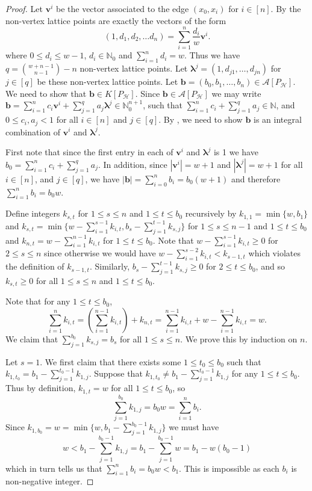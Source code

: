 \documentclass [12pt,a4paper,reqno]{amsart}
\theoremstyle{plain}
\theoremstyle{definition}
\newtheorem{Assumptions and Discussion}[Theorem]{Assumptions and Discussion}
\theoremstyle{remark}
\def\NN{{\mathbb N}}
\def\N{\operatorname{N}} %
\def\N{{\mathbb N}}
\newcommand\bfb{\mathbf{b}}
\newcommand\bfv{\mathbf{v}}
\newcommand\bflam{\boldsymbol{\lambda}}
\newcommand\calA{\mathcal{A}}
\newcommand\calH{\mathcal{H}}
\begin{document}
 \begin{proof}
Let $\mathbf{v}^i$ be the vector associated to the edge $(x_0, x_i)$ for $i\in [n]$. By  the non-vertex lattice points are exactly the vectors of the form 
 \[
    (1,d_1,d_2,\dots d_n)=\sum_{i=1}^n\frac{d_i}{w}\bfv^i. 
 \]
 where $0\leq d_i \leq w-1$, $ d_i \in \mathbb{N}_{0}$ and $\sum_{i=1}^n d_i=w$. 
 Thus we have  $q={w+n-1 \choose n-1} -n$ non-vertex lattice points. Let $\bflam^j=(1,d_{j1},\ldots,d_{jn})$ for $j\in [q]$ be these non-vertex lattice points. Let $\mathbf{b}=(b_{0},b_{1},\ldots,b_{n})\in \calA[P_{\calH}]$.  We need to show that $\bfb\in K[P_{\calH}]$.
Since $\mathbf{b} \in \calA[P_{\calH}]$ we may write $\mathbf{b}=\sum_{i=1}^{n}c_{i}\mathbf{v}^{i}+\sum_{j=1}^{q}a_j\bflam^{j} \in \NN_{0}^{n+1}$, such that
$\sum_{i=1}^{n}c_{i}+\sum_{j=1}^{q}a_{j} \in \N$, and $0\leq c_{i},a_{j}<1$
for all $i\in[n]$ and $j\in[q]$. By , we need to show $\bfb$ is an integral combination of $\bfv^i$ and $\bflam^{j}$. 

First note that since the first entry in each of $\bfv^i$ and $\bflam^j$ is 1 we have $b_0 = \sum_{i=1}^{n}c_{i}+\sum_{j=1}^{q}a_{j}$.  In addition, since $|\mathbf{v}^i|=w+1$ and  $|\bflam^{j}|=w+1$ for all $i\in [n]$, and $j\in [q]$,  we have $|\bfb| = \sum_{i= 0}^nb_i = b_0(w+1)$ and therefore $\sum_{i = 1}^nb_i = b_0w$.




Define integers $k_{s,t}$ for $1\leq s \leq n$ and $1\leq t \leq b_0$ recursively by $k_{1,1} = \min\{w, b_1\}$ and  $k_{s,t} = \min\{w-\sum_{i = 1}^{s-1}k_{i,t}, b_s - \sum_{j = 1}^{t-1} k_{s,j}\}$ for $1 \leq s \leq n-1$ and $1 \leq t \leq b_0$ and $k_{n,t} = w -\sum_{i = 1}^{n-1}k_{i,t}$ for $1 \leq t \leq b_0$.  Note that  $w-\sum_{i = 1}^{s-1}k_{i,t}\geq 0$ for $2\leq s\leq n$ since otherwise we would have $w-\sum_{i = 1}^{s-2}k_{i,t}<k_{s-1,t}$ which violates the definition of $k_{s-1, t}$.  Similarly, $b_s - \sum_{j = 1}^{t-1} k_{s,j}\geq 0$ for $2\leq t\leq b_0$, and so $k_{s,t} \geq 0$ for all $1\leq s \leq n$ and $1\leq t \leq b_0$.

Note that for any $1 \leq t \leq b_0$, \[\sum_{i = 1}^n k_{i,t} = \left(\sum_{i = 1}^{n-1} k_{i,t}\right) + k_{n,t} = \sum_{i = 1}^{n-1} k_{i,t} + w - \sum_{i =1}^{n-1} k_{i,t} = w.\]  
We claim that $\sum_{j = 1}^{b_0} k_{s, j} = b_s$ for all $1 \leq s \leq n$.  We prove this by induction on $n$.  


Let \(s=1\). We first claim that there exists some $1 \leq t_0 \leq b_0$ such that $k_{1,t_0} = b_1 - \sum_{j = 1}^{t_0-1} k_{1,j}$. Suppose that $k_{1,t_0} \neq b_1 - \sum_{j = 1}^{t_0-1} k_{1,j}$ for any $1 \leq t \leq b_0$.  Thus by definition, $k _{1,t} = w$ for all $1 \leq t \leq b_0$, so 
\[
\sum_{j = 1}^{b_0} k_{1,j} = b_0w = \sum_{i =1}^n b_i.
\]
Since $k_{1,b_0} = w = \min\{w, b_1-\sum_{j = 1}^{b_0-1}k_{1,j}\}$ we must have
\[
w < b_1 - \sum_{j = 1}^{b_0-1} k_{1,j}= b_1 - \sum_{j=1}^{b_0-1}w= b_1 - w(b_0 - 1)
\]
which in turn tells us that  \(\sum_{i=1}^n b_i=b_0w < b_1\). This is impossible as each $b_i$ is non-negative integer.


\end{proof}
\end{document}
